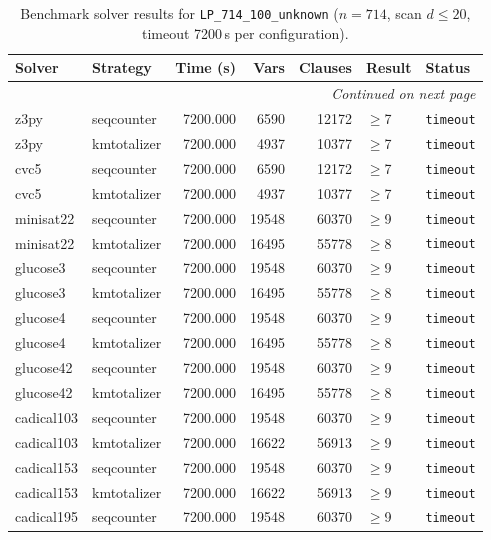 \begin{longtable}{llrrrl p{}}
\caption{Benchmark solver results for \texttt{LP\_714\_100\_unknown} ($n=714$, scan $d \leq 20$, timeout 7200\,s per configuration).} \label{tab:bench-LP_714_100_unknown} \\
\toprule
Solver & Strategy & Time (s) & Vars & Clauses & Result & Status \\
\midrule
\endhead
\midrule
\multicolumn{7}{r}{\textit{Continued on next page}} \\
\midrule
\endfoot
\bottomrule
\endlastfoot
z3py & seqcounter & 7200.000 & 6590 & 12172 & $\geq$7 & \texttt{timeout} \\
z3py & kmtotalizer & 7200.000 & 4937 & 10377 & $\geq$7 & \texttt{timeout} \\
cvc5 & seqcounter & 7200.000 & 6590 & 12172 & $\geq$7 & \texttt{timeout} \\
cvc5 & kmtotalizer & 7200.000 & 4937 & 10377 & $\geq$7 & \texttt{timeout} \\
minisat22 & seqcounter & 7200.000 & 19548 & 60370 & $\geq$9 & \texttt{timeout} \\
minisat22 & kmtotalizer & 7200.000 & 16495 & 55778 & $\geq$8 & \texttt{timeout} \\
glucose3 & seqcounter & 7200.000 & 19548 & 60370 & $\geq$9 & \texttt{timeout} \\
glucose3 & kmtotalizer & 7200.000 & 16495 & 55778 & $\geq$8 & \texttt{timeout} \\
glucose4 & seqcounter & 7200.000 & 19548 & 60370 & $\geq$9 & \texttt{timeout} \\
glucose4 & kmtotalizer & 7200.000 & 16495 & 55778 & $\geq$8 & \texttt{timeout} \\
glucose42 & seqcounter & 7200.000 & 19548 & 60370 & $\geq$9 & \texttt{timeout} \\
glucose42 & kmtotalizer & 7200.000 & 16495 & 55778 & $\geq$8 & \texttt{timeout} \\
cadical103 & seqcounter & 7200.000 & 19548 & 60370 & $\geq$9 & \texttt{timeout} \\
cadical103 & kmtotalizer & 7200.000 & 16622 & 56913 & $\geq$9 & \texttt{timeout} \\
cadical153 & seqcounter & 7200.000 & 19548 & 60370 & $\geq$9 & \texttt{timeout} \\
cadical153 & kmtotalizer & 7200.000 & 16622 & 56913 & $\geq$9 & \texttt{timeout} \\
cadical195 & seqcounter & 7200.000 & 19548 & 60370 & $\geq$9 & \texttt{timeout} \\

\end{longtable}
